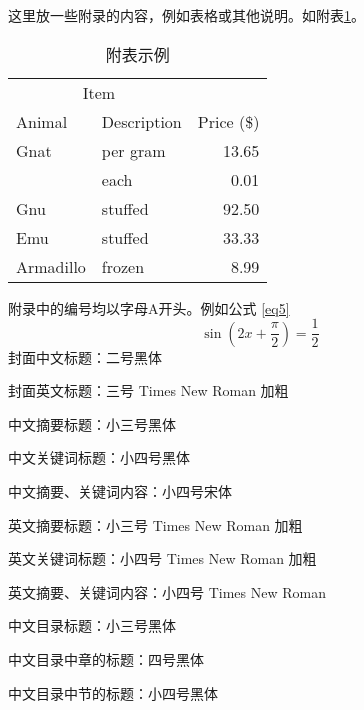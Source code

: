 \documentclass{xmu}
\begin{document}

\begin{appendix}
    这里放一些附录的内容，例如表格或其他说明。如附表\ref{atable}。
    \begin{table}[!htb]
        \centering
        \caption{附表示例}
        \label{atable}
        \songti{}
        \renewcommand\arraystretch{1}
        \begin{tabular}{llr}
            \hline
            \multicolumn{2}{c}{Item} &                          \\ \cline{1-2}
            Animal                   & Description & Price (\$) \\ \hline
            Gnat                     & per gram    & 13.65      \\
                                     & each        & 0.01       \\
            Gnu                      & stuffed     & 92.50      \\
            Emu                      & stuffed     & 33.33      \\
            Armadillo                & frozen      & 8.99       \\ \hline
        \end{tabular}
    \end{table}
    附录中的编号均以字母A开头。例如公式 \ref{eq5}
    \begin{equation}\label{eq5}
        \sin \left(2x+\frac\pi2\right)=\frac 12
    \end{equation}
    封面中文标题：二号黑体\par
    封面英文标题：三号 Times New Roman 加粗\par
    中文摘要标题：小三号黑体\par
    中文关键词标题：小四号黑体\par
    中文摘要、关键词内容：小四号宋体\par
    英文摘要标题：小三号 Times New Roman 加粗\par
    英文关键词标题：小四号 Times New Roman 加粗\par
    英文摘要、关键词内容：小四号 Times New Roman\par
    中文目录标题：小三号黑体\par
    中文目录中章的标题：四号黑体\par
    中文目录中节的标题：小四号黑体\par

\end{appendix}
\end{document}
